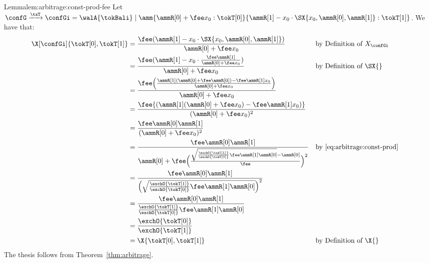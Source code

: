 \begin{proofof}{Lemma}{lem:arbitrage:const-prod-fee}
  Let $\confG \xrightarrow{\txT} \confGi = \walA{\tokBali} \mid \amm{\ammR[0]+\fee x_0:\tokT[0]}{\ammR[1]-x_0 \cdot \SX{x_0,\ammR[0],\ammR[1]}:\tokT[1]}$.
  We have that:
  \begin{align*}
    \X[\confGi]{\tokT[0],\tokT[1]}
    & = 
    \frac{\fee (\ammR[1] - x_0 \cdot \SX{x_0,\ammR[0],\ammR[1]})}{\ammR[0]+\fee x_0}
    && \text{by Definition of $X_{\confGi}$}
    \\
    & =
      \frac
      {\fee (\ammR[1] - x_0 \cdot \frac{\fee \ammR[1]}{\ammR[0]+\fee x_0})}
      {\ammR[0]+\fee x_0}
    && \text{by Definition of $\SX{}$}
    \\
    & = \frac
        {\fee \Big ( \frac
                    {\ammR[1](\ammR[0] + \fee \ammR[0]) - \fee \ammR[1] x_0}
                    {\ammR[0] + \fee x_0}
        \Big )}
        {\ammR[0] + \fee x_0}
    \\
    & = \frac
        {\fee{(\ammR[1] (\ammR[0] + \fee x_0) - \fee \ammR[1] x_0) }}
        {(\ammR[0] + \fee x_0)^2}
    \\
    & = \frac{\fee \ammR[0]\ammR[1]}{(\ammR[0] + \fee x_0)^2}
    \\
    & = \frac
        {\fee \ammR[0]\ammR[1]}
        {\ammR[0] + \fee \Big ( \frac
                                {\sqrt{\frac{\exchO{\tokT[1]}}{\exchO{\tokT[0]}} \fee \ammR[1] \ammR[0]} - \ammR[0]}
                                {\fee}
                        \Big )^2}
    && \text{by~\Cref{eq:arbitrage:const-prod}}
    \\
    & = \frac
        {\fee \ammR[0]\ammR[1]}
        {\Big ( \sqrt{\frac{\exchO{\tokT[1]}}{\exchO{\tokT[0]}} \fee \ammR[1] \ammR[0]} 
        \Big )^2}
    \\
    & = \frac
        {\fee \ammR[0]\ammR[1]}
        {\frac{\exchO{\tokT[1]}}{\exchO{\tokT[0]}} \fee \ammR[1] \ammR[0]}
    \\
    & = \frac{\exchO{\tokT[0]}}{\exchO{\tokT[1]}}
    \\
    & = \X{\tokT[0],\tokT[1]}
    && \text{by Definition of $\X{}$}
  \end{align*}
  The thesis follows from Theorem~\ref{thm:arbitrage}.
\end{proofof}
